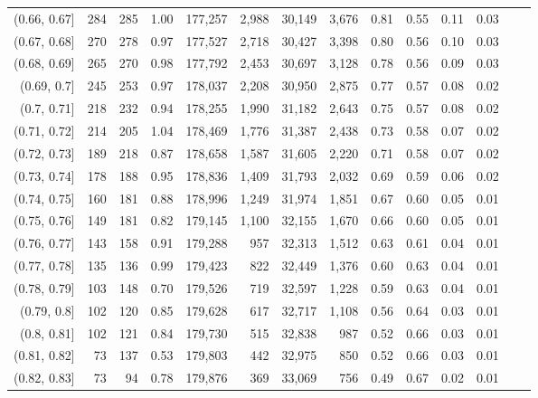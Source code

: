 \begin{tabular}{rrrrrrrrrrrrrr}
(0.66, 0.67]   &    284 &  285 &    1.00 &  177,257 &    2,988 &  30,149 &   3,676 &  0.81 &  0.55 &  0.11 &      0.03 \\
(0.67, 0.68]   &    270 &  278 &    0.97 &  177,527 &    2,718 &  30,427 &   3,398 &  0.80 &  0.56 &  0.10 &      0.03 \\
(0.68, 0.69]   &    265 &  270 &    0.98 &  177,792 &    2,453 &  30,697 &   3,128 &  0.78 &  0.56 &  0.09 &      0.03 \\
(0.69, 0.7]    &    245 &  253 &    0.97 &  178,037 &    2,208 &  30,950 &   2,875 &  0.77 &  0.57 &  0.08 &      0.02 \\
(0.7, 0.71]    &    218 &  232 &    0.94 &  178,255 &    1,990 &  31,182 &   2,643 &  0.75 &  0.57 &  0.08 &      0.02 \\
(0.71, 0.72]   &    214 &  205 &    1.04 &  178,469 &    1,776 &  31,387 &   2,438 &  0.73 &  0.58 &  0.07 &      0.02 \\
(0.72, 0.73]   &    189 &  218 &    0.87 &  178,658 &    1,587 &  31,605 &   2,220 &  0.71 &  0.58 &  0.07 &      0.02 \\
(0.73, 0.74]   &    178 &  188 &    0.95 &  178,836 &    1,409 &  31,793 &   2,032 &  0.69 &  0.59 &  0.06 &      0.02 \\
(0.74, 0.75]   &    160 &  181 &    0.88 &  178,996 &    1,249 &  31,974 &   1,851 &  0.67 &  0.60 &  0.05 &      0.01 \\
(0.75, 0.76]   &    149 &  181 &    0.82 &  179,145 &    1,100 &  32,155 &   1,670 &  0.66 &  0.60 &  0.05 &      0.01 \\
(0.76, 0.77]   &    143 &  158 &    0.91 &  179,288 &      957 &  32,313 &   1,512 &  0.63 &  0.61 &  0.04 &      0.01 \\
(0.77, 0.78]   &    135 &  136 &    0.99 &  179,423 &      822 &  32,449 &   1,376 &  0.60 &  0.63 &  0.04 &      0.01 \\
(0.78, 0.79]   &    103 &  148 &    0.70 &  179,526 &      719 &  32,597 &   1,228 &  0.59 &  0.63 &  0.04 &      0.01 \\
(0.79, 0.8]    &    102 &  120 &    0.85 &  179,628 &      617 &  32,717 &   1,108 &  0.56 &  0.64 &  0.03 &      0.01 \\
(0.8, 0.81]    &    102 &  121 &    0.84 &  179,730 &      515 &  32,838 &     987 &  0.52 &  0.66 &  0.03 &      0.01 \\
(0.81, 0.82]   &     73 &  137 &    0.53 &  179,803 &      442 &  32,975 &     850 &  0.52 &  0.66 &  0.03 &      0.01 \\
(0.82, 0.83]   &     73 &   94 &    0.78 &  179,876 &      369 &  33,069 &     756 &  0.49 &  0.67 &  0.02 &      0.01 \\

\end{tabular}
